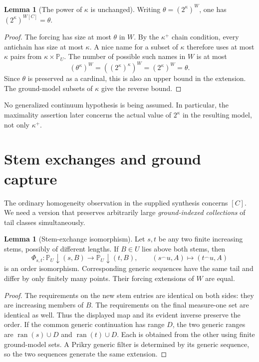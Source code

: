 \documentclass[11pt,letterpaper]{article}
\theoremstyle{definition}
\newtheorem{lemma}[definition]{Lemma}
\numberwithin{equation}{section}
\newcommand{\PP}{\mathbb P}
\newcommand{\ran}{\operatorname{ran}}
\newcommand{\concat}{\mathbin{{}^\frown}}
\begin{document}
\begin{lemma}[The power of $\kappa$ is unchanged]\label{lem:power}
Writing $\theta=(2^\kappa)^W$, one has $(2^\kappa)^{W[C]}=\theta$.
\end{lemma}
\begin{proof}
The forcing has size at most $\theta$ in $W$. By the $\kappa^+$ chain condition, every antichain has size at most $\kappa$. A nice name for a subset of $\kappa$ therefore uses at most $\kappa$ pairs from $\kappa\times\PP_U$. The number of possible such names in $W$ is at most
\[
 (\theta^\kappa)^W=((2^\kappa)^\kappa)^W=(2^\kappa)^W=\theta.
\]
Since $\theta$ is preserved as a cardinal, this is also an upper bound in the extension. The ground-model subsets of $\kappa$ give the reverse bound.
\end{proof}

No generalized continuum hypothesis is being assumed. In particular, the maximality assertion later concerns the actual value of $2^\kappa$ in the resulting model, not only $\kappa^+$.

\section{Stem exchanges and ground capture}\label{sec:capture}

The ordinary homogeneity observation in the supplied synthesis concerns $[C]$. We need a version that preserves arbitrarily large \emph{ground-indexed collections} of tail classes simultaneously.

\begin{lemma}[Stem-exchange isomorphism]\label{lem:cones}
Let $s,t$ be any two finite increasing stems, possibly of different lengths. If $B\in U$ lies above both stems, then
\begin{equation}\label{eq:cone}
 \Phi_{s,t}:\PP_U\mathbin\downarrow(s,B)
       \longrightarrow\PP_U\mathbin\downarrow(t,B),\qquad
 (s\concat u,A)\longmapsto(t\concat u,A)
\end{equation}
is an order isomorphism. Corresponding generic sequences have the same tail and differ by only finitely many points. Their forcing extensions of $W$ are equal.
\end{lemma}
\begin{proof}
The requirements on the new stem entries are identical on both sides: they are increasing members of $B$. The requirements on the final measure-one set are identical as well. Thus the displayed map and its evident inverse preserve the order. If the common generic continuation has range $D$, the two generic ranges are $\ran(s)\cup D$ and $\ran(t)\cup D$. Each is obtained from the other using finite ground-model sets. A Prikry generic filter is determined by its generic sequence, so the two sequences generate the same extension.
\end{proof}
\end{document}
